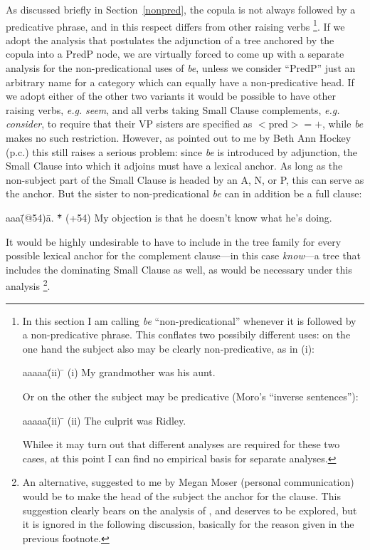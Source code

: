 \label{nonpsol}
As discussed briefly in Section~\ref{nonpred}, the copula is not always
followed by a predicative phrase, and in this respect differs from other
raising verbs%
%
\footnote{In this section I am calling {\em be\/} ``non-predicational''
whenever it is followed by a non-predicative phrase.  This conflates two
possibily different uses: on the one hand the subject also may be
clearly non-predicative, as in (i):
\begin{tabbing}
aaaaa\=(ii) \= \kill
     \>(i)  \>  My grandmother was his aunt.
\end{tabbing}
Or on the other the subject may be predicative (Moro's ``inverse sentences''):
\begin{tabbing}
aaaaa\=(ii) \= \kill
     \>(ii)  \> The culprit was Ridley.
\end{tabbing}
Whilee it may turn out that different analyses are required for
these two cases, at this point I can find no empirical
basis for separate analyses.}.
%
If we adopt the analysis that postulates the adjunction
of a tree anchored by the copula into a PredP node, we are virtually
forced to come up with a separate analysis for the non-predicational
uses of {\em be}, unless we consider ``PredP'' just an arbitrary name
for a category which can equally have a non-predicative head. If we
adopt either of the other two variants it would be possible to have
other raising verbs, {\em e.g.\/} {\em seem}, and all verbs taking Small
Clause complements, {\em e.g.\/} {\em consider\/}, to require that their
VP sisters are specified as $<$pred$> = +$, while {\em be} makes no such
restriction.  However, as pointed out to me by Beth Ann Hockey (p.c.)
this still raises a serious problem: since {\em be} is
introduced by adjunction, the Small Clause into which it adjoins must
have a lexical anchor.  As long as the non-subject part of the Small
Clause is headed by an A, N, or P, this can serve as the anchor.  But
the sister to non-predicational {\em be} can in addition be a full
clause:
\begin{tabbing}
aaa\=(@54)\=a. \= *\= \kill
   \>(+54)\>   \>  \> My objection is that he doesn't know what he's doing.  
\end{tabbing}
It would be highly undesirable to have to include in the tree family for
every possible lexical anchor for the complement clause---in this case
{\em know\/}---a tree that includes the dominating Small Clause as well,
as would be necessary under this analysis%
%
\footnote{An alternative, suggested to me by Megan Moser (personal
communication) would be to make the head of the subject the anchor for
the clause.  This suggestion clearly bears on the analysis of \cite{mor90}, and
deserves to be explored, but it is ignored in the following discussion, basically
for the reason given in the previous footnote.}.
%

